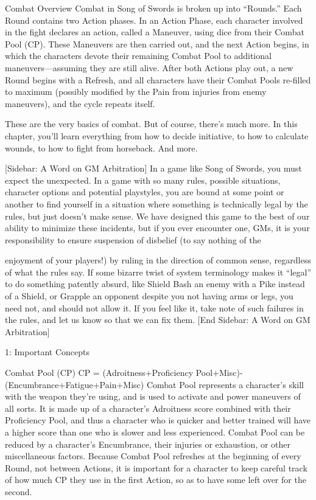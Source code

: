 \documentclass[oneside,11pt,english]{book}
\begin{document}
 

Combat Overview 
Combat in Song of Swords is broken up into “Rounds.” Each Round contains two Action phases. In an 
Action Phase, each character involved in the fight declares an action, called a Maneuver, using dice from 
their Combat Pool (CP). These Maneuvers are then carried out, and the next Action begins, in which the 
characters devote their remaining Combat Pool to additional maneuvers—assuming they are still alive. 
After both Actions play out, a new Round begins with a Refresh, and all characters have their Combat 
Pools re-filled to maximum (possibly modified by the Pain from injuries from enemy maneuvers), and the 
cycle repeats itself. 

 

These are the very basics of combat. But of course, there’s much more. In this chapter, you’ll learn 
everything from how to decide initiative, to how to calculate wounds, to how to fight from horseback. 
And more. 

 

[Sidebar: A Word on GM Arbitration] 
In a game like Song of Swords, you must expect the unexpected. In a game with so many rules, possible 
situations, character options and potential playstyles, you are bound at some point or another to find 
yourself in a situation where something is technically legal by the rules, but just doesn’t make sense. 
We have designed this game to the best of our ability to minimize these incidents, but if you ever 
encounter one, GMs, it is your responsibility to ensure suspension of disbelief (to say nothing of the 


enjoyment of your players!) by ruling in the direction of common sense, regardless of what the rules say. 
If some bizarre twist of system terminology makes it “legal” to do something patently absurd, like Shield 
Bash an enemy with a Pike instead of a Shield, or Grapple an opponent despite you not having arms or 
legs, you need not, and should not allow it. 
If you feel like it, take note of such failures in the rules, and let us know so that we can fix them. 
[End Sidebar: A Word on GM Arbitration] 

 

 

 

1: Important Concepts 

 

Combat Pool (CP) 
CP = (Adroitness+Proficiency Pool+Misc)-(Encumbrance+Fatigue+Pain+Misc) 
Combat Pool represents a character's skill with the weapon they’re using, and is used to activate and 
power maneuvers of all sorts. It is made up of a character's Adroitness score combined with their 
Proficiency Pool, and thus a character who is quicker and better trained will have a higher score than one 
who is slower and less experienced. 
Combat Pool can be reduced by a character's Encumbrance, their injuries or exhaustion, or other 
miscellaneous factors. Because Combat Pool refreshes at the beginning of every Round, not between 
Actions, it is important for a character to keep careful track of how much CP they use in the first Action, 
so as to have some left over for the second. 
\end{document}
